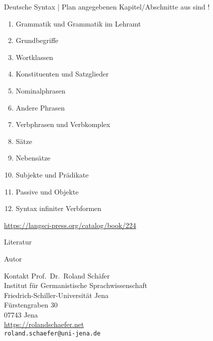 \documentclass[handout,aspectratio=1610,dvipsnames]{beamer}
\begin{document}
  \begin{frame}
    {Deutsche Syntax | Plan}
     angegebenen Kapitel\slash Abschnitte aus  sind !\\
    \Halbzeile
    \begin{enumerate}
      \item Grammatik und Grammatik im Lehramt 
      \item Grundbegriffe 
      \item Wortklassen 
      \item Konstituenten und Satzglieder 
      \item Nominalphrasen 
      \item Andere Phrasen 
      \item Verbphrasen und Verbkomplex 
      \item Sätze  
      \item Nebensätze 
      \item Subjekte und Prädikate 
      \item Passive und Objekte 
      \item Syntax infiniter Verbformen 
    \end{enumerate}
    \Halbzeile
    \centering 
    \url{https://langsci-press.org/catalog/book/224}
  \end{frame}
\fi


\makeatletter
\setcounter{lastpagemainpart}{\the\c@framenumber}
\makeatother

\appendix

\begin{frame}[allowframebreaks]
  {Literatur}
  \renewcommand*{\bibfont}{\footnotesize}
  \printbibliography
\end{frame}

\begin{frame}
  {Autor}
  \begin{block}{Kontakt}
    Prof.\ Dr.\ Roland Schäfer\\
    Institut für Germanistische Sprachwissenschaft\\
    Friedrich-Schiller-Universität Jena\\
    Fürstengraben 30\\
    07743 Jena\\[\baselineskip]
    \url{https://rolandschaefer.net}\\
    \texttt{roland.schaefer@uni-jena.de}
  \end{block}
\end{frame}
\end{document}
